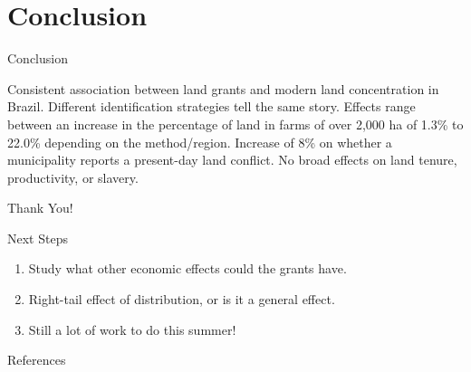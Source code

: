 \documentclass[aspectratio=1610]{beamer}
\begin{document}
\section{Conclusion}

\begin{frame}{Conclusion}
    \begin{outline}
        \1 Consistent association between land grants and modern land concentration in Brazil.
        \vspace{2mm}
            \2 Different identification strategies tell the same story.
        \vspace{2mm}
            \2 Effects range between an increase in the percentage of land in farms of over 2,000 ha of 1.3\% to 22.0\% depending on the method/region.
        \vspace{2mm}
        \1 Increase of 8\% on whether a municipality reports a present-day land conflict.
        \vspace{2mm}
        \2 No broad effects on land tenure, productivity, or slavery.
        \vspace{2mm}
    \end{outline}
\end{frame}

\begin{frame}
    \centering \Huge
    Thank You!
\end{frame}

\begin{frame}{Next Steps}
    \begin{enumerate}
        \item Study what other economic effects could the grants have.
        \vspace{2mm}
        \item Right-tail effect of distribution, or is it a general effect. 
        \vspace{2mm}
        \item Still a lot of work to do this summer! 
    \end{enumerate}
\end{frame}

\begin{frame}{References}
    \printbibliography
\end{frame}

\appendix

    
\end{document}
